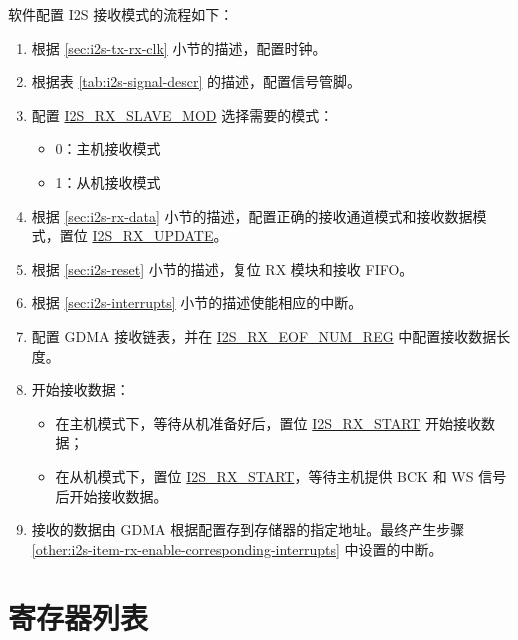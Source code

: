 \documentclass[main\_\_CN.tex]{subfiles}
\begin{document}
软件配置 I2S 接收模式的流程如下：

\begin{enumerate}
    \item 根据 \ref{sec:i2s-tx-rx-clk} 小节的描述，配置时钟。
    \item 根据表 \ref{tab:i2s-signal-descr} 的描述，配置信号管脚。
    \item 配置 \hyperref[fielddesc:I2SRXSLAVEMOD]{I2S\_RX\_SLAVE\_MOD} 选择需要的模式：
    \begin{itemize}
        \item 0：主机接收模式
        \item 1：从机接收模式
    \end{itemize}
    \item 根据 \ref{sec:i2s-rx-data} 小节的描述，配置正确的接收通道模式和接收数据模式，置位 \hyperref[fielddesc:I2SRXUPDATE]{I2S\_RX\_UPDATE}。
    \item 根据 \ref{sec:i2s-reset} 小节的描述，复位 RX 模块和接收 FIFO。
    \item 根据 \ref{sec:i2s-interrupts} 小节的描述使能相应的中断。\label{other:i2s-item-rx-enable-corresponding-interrupts}
    \item 配置 GDMA 接收链表，并在 \hyperref[regdesc:I2SRXEOFNUMREG]{I2S\_RX\_EOF\_NUM\_REG} 中配置接收数据长度。
    \item 开始接收数据：
    \begin{itemize}
        \item 在主机模式下，等待从机准备好后，置位 \hyperref[fielddesc:I2SRXSTART]{I2S\_RX\_START} 开始接收数据；
        \item 在从机模式下，置位 \hyperref[fielddesc:I2SRXSTART]{I2S\_RX\_START}，等待主机提供 BCK 和 WS 信号后开始接收数据。
    \end{itemize}
    \item 接收的数据由 GDMA 根据配置存到存储器的指定地址。最终产生步骤 \ref{other:i2s-item-rx-enable-corresponding-interrupts} 中设置的中断。
\end{enumerate}





\newpage
\hypertarget{i2s-reg-summ}{}
\section{寄存器列表}
\label{sec:i2s-reg-summ}
\end{document}

